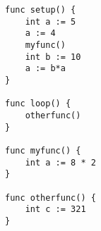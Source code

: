 \begin{lstlisting}[caption={Program structure similar to Arduino but where loop is optional}]
func setup() {
	int a := 5
	a := 4
	myfunc()
	int b := 10
	a := b*a
}

func loop() {
	otherfunc()
}

func myfunc() {
	int a := 8 * 2
}

func otherfunc() {
	int c := 321
}
\end{lstlisting}